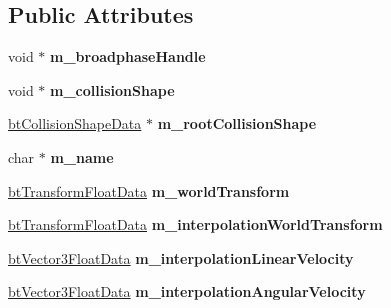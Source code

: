 \subsection*{Public Attributes}
\begin{DoxyCompactItemize}
\item 
\mbox{\label{structbtCollisionObjectFloatData_a062ea04e50416b67d4ab3a7a61201c77}} 
void $\ast$ {\bfseries m\+\_\+broadphase\+Handle}
\item 
\mbox{\label{structbtCollisionObjectFloatData_a1b4a59afdb9ab403720f49b8a17ec52b}} 
void $\ast$ {\bfseries m\+\_\+collision\+Shape}
\item 
\mbox{\label{structbtCollisionObjectFloatData_a786940c33dcc164641e50284d1e75f0f}} 
\hyperlink{structbtCollisionShapeData}{bt\+Collision\+Shape\+Data} $\ast$ {\bfseries m\+\_\+root\+Collision\+Shape}
\item 
\mbox{\label{structbtCollisionObjectFloatData_a378f958f2699124d02bcde6a833646a1}} 
char $\ast$ {\bfseries m\+\_\+name}
\item 
\mbox{\label{structbtCollisionObjectFloatData_acb0af4d684ed6096e1ae7ca24dcc81de}} 
\hyperlink{structbtTransformFloatData}{bt\+Transform\+Float\+Data} {\bfseries m\+\_\+world\+Transform}
\item 
\mbox{\label{structbtCollisionObjectFloatData_a793935f8469552b65df58a21856f76ec}} 
\hyperlink{structbtTransformFloatData}{bt\+Transform\+Float\+Data} {\bfseries m\+\_\+interpolation\+World\+Transform}
\item 
\mbox{\label{structbtCollisionObjectFloatData_a0d9540ce184421b3f8de9d820812fd48}} 
\hyperlink{structbtVector3FloatData}{bt\+Vector3\+Float\+Data} {\bfseries m\+\_\+interpolation\+Linear\+Velocity}
\item 
\mbox{\label{structbtCollisionObjectFloatData_a92aa90d9a10c8f82225b01b39d18f687}} 
\hyperlink{structbtVector3FloatData}{bt\+Vector3\+Float\+Data} {\bfseries m\+\_\+interpolation\+Angular\+Velocity}

\end{DoxyCompactItemize}

